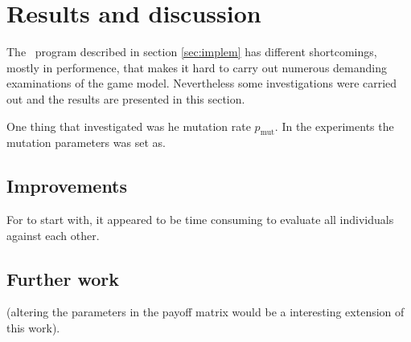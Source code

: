 \section{Results and discussion}\label{sec:results}
The \matlab\ program described in section \ref{sec:implem} has different shortcomings, mostly in performence, that makes it hard to carry out numerous demanding examinations of the game model. Nevertheless some investigations were carried out and the results are presented in this section.\mypar

One thing that investigated was he mutation rate $p_{\textrm{mut}}$. In the experiments the mutation parameters was set as. 




\subsection{Improvements}
For to start with, it appeared to be time consuming to evaluate all individuals against each other.

\subsection{Further work}
(altering the parameters in the payoff matrix would be a interesting extension of this work).


